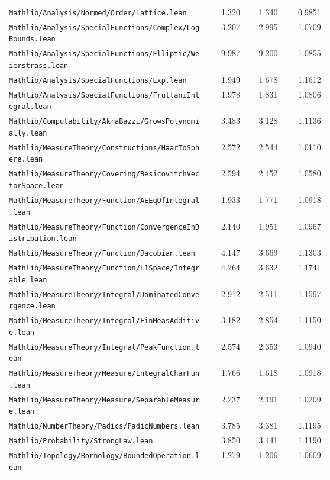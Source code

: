{\begin{longtable}{p{0.63\linewidth}rrr}
\nolinkurl{Mathlib/Analysis/Normed/Order/Lattice.lean} & 1.320 & 1.340 & 0.9851\\
\nolinkurl{Mathlib/Analysis/SpecialFunctions/Complex/LogBounds.lean} & 3.207 & 2.995 & 1.0709\\
\nolinkurl{Mathlib/Analysis/SpecialFunctions/Elliptic/Weierstrass.lean} & 9.987 & 9.200 & 1.0855\\
\nolinkurl{Mathlib/Analysis/SpecialFunctions/Exp.lean} & 1.949 & 1.678 & 1.1612\\
\nolinkurl{Mathlib/Analysis/SpecialFunctions/FrullaniIntegral.lean} & 1.978 & 1.831 & 1.0806\\
\nolinkurl{Mathlib/Computability/AkraBazzi/GrowsPolynomially.lean} & 3.483 & 3.128 & 1.1136\\
\nolinkurl{Mathlib/MeasureTheory/Constructions/HaarToSphere.lean} & 2.572 & 2.544 & 1.0110\\
\nolinkurl{Mathlib/MeasureTheory/Covering/BesicovitchVectorSpace.lean} & 2.594 & 2.452 & 1.0580\\
\nolinkurl{Mathlib/MeasureTheory/Function/AEEqOfIntegral.lean} & 1.933 & 1.771 & 1.0918\\
\nolinkurl{Mathlib/MeasureTheory/Function/ConvergenceInDistribution.lean} & 2.140 & 1.951 & 1.0967\\
\nolinkurl{Mathlib/MeasureTheory/Function/Jacobian.lean} & 4.147 & 3.669 & 1.1303\\
\nolinkurl{Mathlib/MeasureTheory/Function/L1Space/Integrable.lean} & 4.264 & 3.632 & 1.1741\\
\nolinkurl{Mathlib/MeasureTheory/Integral/DominatedConvergence.lean} & 2.912 & 2.511 & 1.1597\\
\nolinkurl{Mathlib/MeasureTheory/Integral/FinMeasAdditive.lean} & 3.182 & 2.854 & 1.1150\\
\nolinkurl{Mathlib/MeasureTheory/Integral/PeakFunction.lean} & 2.574 & 2.353 & 1.0940\\
\nolinkurl{Mathlib/MeasureTheory/Measure/IntegralCharFun.lean} & 1.766 & 1.618 & 1.0918\\
\nolinkurl{Mathlib/MeasureTheory/Measure/SeparableMeasure.lean} & 2.237 & 2.191 & 1.0209\\
\nolinkurl{Mathlib/NumberTheory/Padics/PadicNumbers.lean} & 3.785 & 3.381 & 1.1195\\
\nolinkurl{Mathlib/Probability/StrongLaw.lean} & 3.850 & 3.441 & 1.1190\\
\nolinkurl{Mathlib/Topology/Bornology/BoundedOperation.lean} & 1.279 & 1.206 & 1.0609\\

\end{longtable}}
